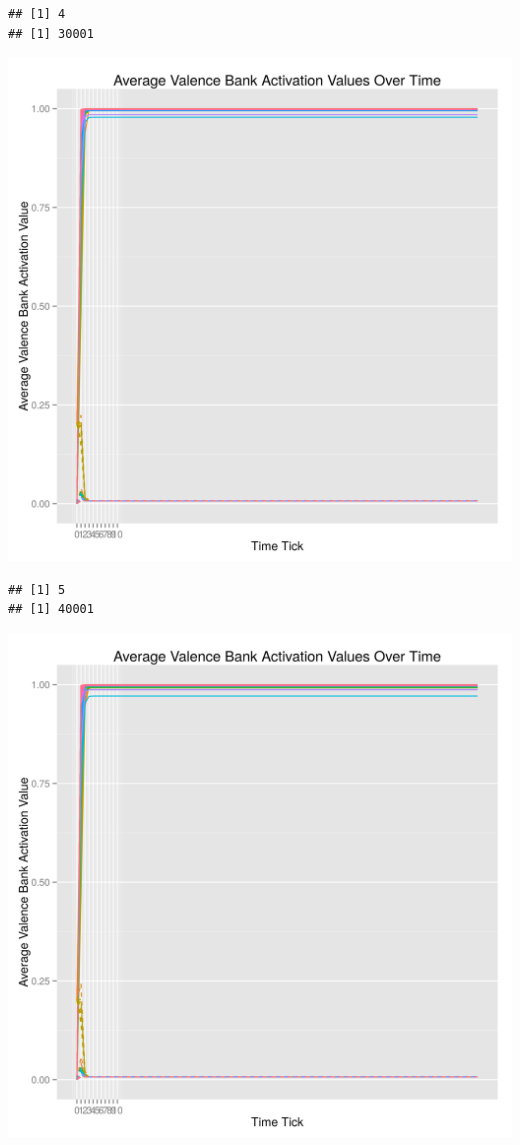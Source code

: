\documentclass{article}\usepackage[]{graphicx}\usepackage[]{color}
\makeatletter
\def\maxwidth{ %
  \ifdim\Gin@nat@width>\linewidth
    \linewidth
  \else
    \Gin@nat@width
  \fi
}
\newenvironment{kframe}{%
 \def\at@end@of@kframe{}%
 \ifinner\ifhmode%
  \def\at@end@of@kframe{\end{minipage}}%
  \begin{minipage}{\columnwidth}%
 \fi\fi%
 \def\FrameCommand##1{\hskip\@totalleftmargin \hskip-\fboxsep
 \colorbox{shadecolor}{##1}\hskip-\fboxsep
     \hskip-\linewidth \hskip-\@totalleftmargin \hskip\columnwidth}%
 \MakeFramed {\advance\hsize-\width
   \@totalleftmargin\z@ \linewidth\hsize
   \@setminipage}}%
 {\par\unskip\endMakeFramed%
 \at@end@of@kframe}
\newenvironment{knitrout}{}{} %
\makeatother
\begin{document}
\begin{knitrout}
\begin{kframe}\begin{verbatim}
## [1] 4
## [1] 30001
\end{verbatim}
\end{kframe}
\includegraphics[width=\maxwidth]{figure/unnamed-chunk-24} 
\begin{kframe}\begin{verbatim}
## [1] 5
## [1] 40001
\end{verbatim}
\end{kframe}
\includegraphics[width=\maxwidth]{figure/unnamed-chunk-25} 

\end{knitrout}
\end{document}
